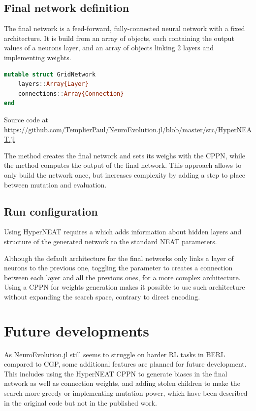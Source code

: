 \subsection{Final network definition}
\label{sub:final-hn-net}
The final network is a feed-forward, fully-connected neural network with a fixed architecture. It is build from an array of  objects, each containing the output values of a neurons layer, and an array of  objects linking 2 layers and implementing weights. 

\begin{minipage}{\linewidth}
\begin{lstlisting}[language=Julia, caption=HyperNEAT final network]
mutable struct GridNetwork
    layers::Array{Layer}
    connections::Array{Connection}
end
\end{lstlisting}
Source code at \url{https://github.com/TemplierPaul/NeuroEvolution.jl/blob/master/src/HyperNEAT.jl}\\
\end{minipage}

The  method creates the final network and sets its weighs with the CPPN, while the  method computes the output of the final network. This approach allows to only build the network once, but increases complexity by adding a step to place between mutation and evaluation.

\subsection{Run configuration}

Using HyperNEAT requires a  which adds information about hidden layers and structure of the generated network to the standard NEAT parameters. 

Although the default architecture for the final networks only links a layer of neurons to the previous one, toggling the  parameter to  creates a connection between each layer and all the previous ones, for a more complex architecture. Using a CPPN for weights generation makes it possible to use such architecture without expanding the search space, contrary to direct encoding. 

\section{Future developments}

As NeuroEvolution.jl still seems to struggle on harder RL tasks in BERL compared to CGP, some additional features are planned for future development. This includes using the HyperNEAT CPPN to generate biases in the final network as well as connection weights, and adding stolen children to make the search more greedy or implementing mutation power, which have been described in the original code but not in the published work.

